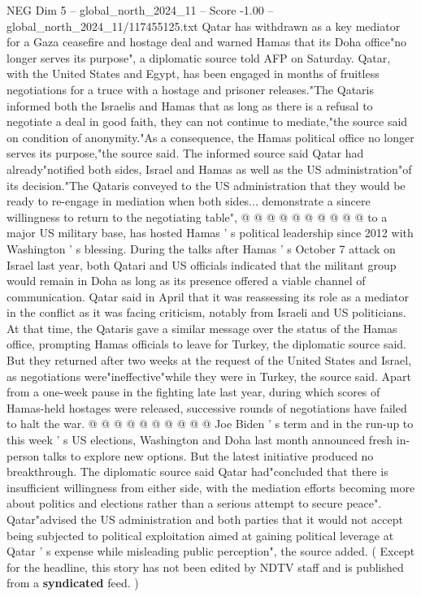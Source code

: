 \begin{textsample}{NEG Dim 5 – global\_north\_2024\_11 – Score -1.00 – global\_north\_2024\_11/117455125.txt}  \label{ex:f5_neg_411}
Qatar has withdrawn as a key mediator for a Gaza ceasefire and hostage deal and warned Hamas that its Doha office"no longer serves its purpose", a diplomatic source told AFP on Saturday.
Qatar, with the United States and Egypt, has been engaged in months of fruitless negotiations for a truce with a hostage and prisoner releases."The Qataris informed both the Israelis and Hamas that as long as there is a refusal to negotiate a deal in good faith, they can not continue to mediate,"the source said on condition of anonymity."As a consequence, the Hamas political office no longer serves its purpose,"the source said.
The informed source said Qatar had already"notified both sides, Israel and Hamas as well as the US administration"of its decision."The Qataris conveyed to the US administration that they would be ready to re-engage in mediation when both sides... demonstrate a sincere willingness to return to the negotiating table", @ @ @ @ @ @ @ @ @ @ to a major US military base, has hosted Hamas ' s political leadership since 2012 with Washington ' s blessing.
During the talks after Hamas ' s October 7 attack on Israel last year, both Qatari and US officials indicated that the militant group would remain in Doha as long as its presence offered a viable channel of communication.
Qatar said in April that it was reassessing its role as a mediator in the conflict as it was facing criticism, notably from Israeli and US politicians.
At that time, the Qataris gave a similar message over the status of the Hamas office, prompting Hamas officials to leave for Turkey, the diplomatic source said.
But they returned after two weeks at the request of the United States and Israel, as negotiations were"ineffective"while they were in Turkey, the source said.
Apart from a one-week pause in the fighting late last year, during which scores of Hamas-held hostages were released, successive rounds of negotiations have failed to halt the war. @ @ @ @ @ @ @ @ @ @ Joe Biden ' s term and in the run-up to this week ' s US elections, Washington and Doha last month announced fresh in-person talks to explore new options.
But the latest initiative produced no breakthrough.
The diplomatic source said Qatar had"concluded that there is insufficient willingness from either side, with the mediation efforts becoming more about politics and elections rather than a serious attempt to secure peace".
Qatar"advised the US administration and both parties that it would not accept being subjected to political exploitation aimed at gaining political leverage at Qatar ' s expense while misleading public perception", the source added. ( Except for the headline, this story has not been edited by NDTV staff and is published from a \textbf{syndicated} feed. )

\end{textsample}

